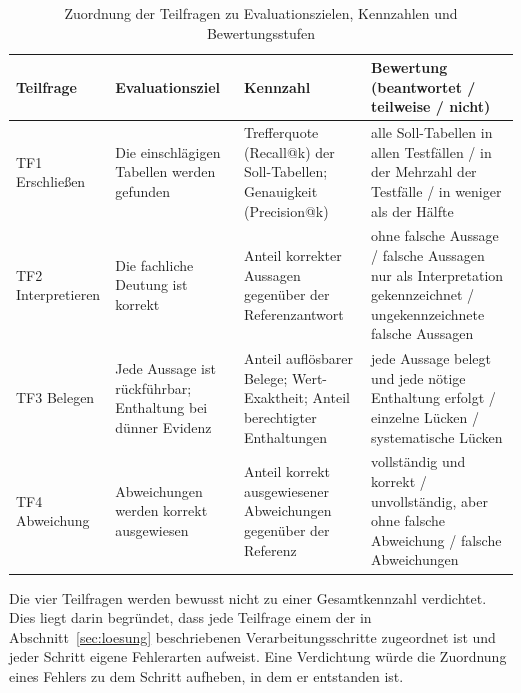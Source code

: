 \begin{table}[htbp]
\centering
\caption{Zuordnung der Teilfragen zu Evaluationszielen, Kennzahlen und Bewertungsstufen}
\label{tab:eval-ziele}
\small
\begin{tabular}{p{1.9cm}p{3.0cm}p{3.0cm}p{4.3cm}}
\toprule
\textbf{Teilfrage} & \textbf{Evaluationsziel} & \textbf{Kennzahl} & \textbf{Bewertung (beantwortet / teilweise / nicht)} \\
\midrule
TF1 Erschließen & Die einschlägigen Tabellen werden gefunden & Trefferquote (Recall@k) der Soll-Tabellen; Genauigkeit (Precision@k) & alle Soll-Tabellen in allen Testfällen / in der Mehrzahl der Testfälle / in weniger als der Hälfte \\
TF2 Interpretieren & Die fachliche Deutung ist korrekt & Anteil korrekter Aussagen gegenüber der Referenzantwort & ohne falsche Aussage / falsche Aussagen nur als Interpretation gekennzeichnet / ungekennzeichnete falsche Aussagen \\
TF3 Belegen & Jede Aussage ist rückführbar; Enthaltung bei dünner Evidenz & Anteil auflösbarer Belege; Wert-Exaktheit; Anteil berechtigter Enthaltungen & jede Aussage belegt und jede nötige Enthaltung erfolgt / einzelne Lücken / systematische Lücken \\
TF4 Abweichung & Abweichungen werden korrekt ausgewiesen & Anteil korrekt ausgewiesener Abweichungen gegenüber der Referenz & vollständig und korrekt / unvollständig, aber ohne falsche Abweichung / falsche Abweichungen \\
\bottomrule
\end{tabular}
\end{table}

Die vier Teilfragen werden bewusst nicht zu einer Gesamtkennzahl verdichtet. Dies liegt darin begründet, dass jede Teilfrage einem der in Abschnitt~\ref{sec:loesung} beschriebenen Verarbeitungsschritte zugeordnet ist und jeder Schritt eigene Fehlerarten aufweist. Eine Verdichtung würde die Zuordnung eines Fehlers zu dem Schritt aufheben, in dem er entstanden ist. %


